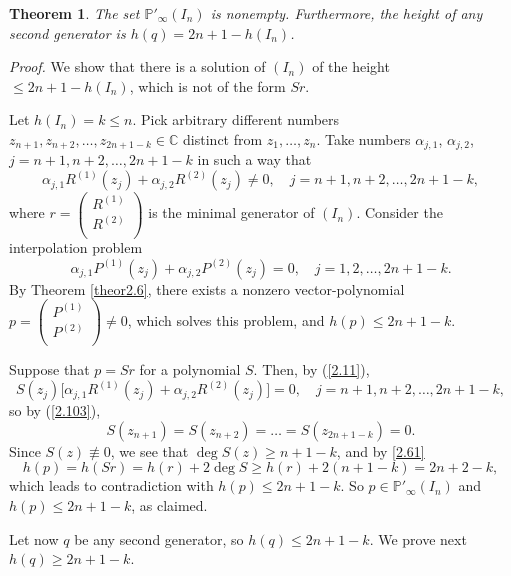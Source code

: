 \documentclass{amsart}
\newtheorem{theorem}{Theorem}[section]
\begin{document}
\begin{theorem}\label{theor2.7}
The set ${{\mathbb P}}'_\infty(I_n)$ is nonempty. Furthermore, the height of
any second generator is $h(q)=2n+1-h(I_n)$.
\end{theorem}

{\it Proof.} We show that there is a solution of $(I_n)$ of the
height $\le 2n+1-h(I_n)$, which is not of the form $Sr$.

Let $h(I_n)=k\le n$. Pick arbitrary different numbers
$z_{n+1},z_{n+2},\ldots,z_{2n+1-k}\in {{\mathbb C}}$ distinct from
$z_1,\ldots,z_n$. Take numbers ${\alpha}_{j,1}$, ${\alpha}_{j,2}$,
$j=n+1,n+2,\ldots,2n+1-k$ in such a way that
\begin{equation}\label{2.103} {\alpha}_{j,1}
R^{(1)} (z_j) + {\alpha}_{j,2} R^{(2)} (z_j) \ne 0, \quad
j=n+1,n+2,\ldots,2n+1-k,
\end{equation}
where $ r = \left(\begin{array}{c} R^{(1)} \\ R^{(2)}\\
\end{array}\right) $ is the minimal generator of $(I_n)$.
Consider the interpolation problem
\begin{equation}\label{2.11} {\alpha}_{j,1}
P^{(1)} (z_j) + {\alpha}_{j,2} P^{(2)} (z_j) = 0, \quad
j=1,2,\ldots,2n+1-k.
\end{equation}
By Theorem \ref{theor2.6}, there exists a nonzero vector-polynomial
$ p =
 \left(\begin{array}{c} P^{(1)} \\ P^{(2)}\\
\end{array}\right) \ne 0$, which solves this problem, and $h(p)
\leq 2n + 1 -k$.

Suppose that $p = Sr$ for a polynomial $S$. Then, by (\ref{2.11}),
$$ S(z_j) \bigl[ {\alpha}_{j,1} R^{(1)} (z_j) + {\alpha}_{j,2} R^{(2)} (z_j) \bigr] = 0,
\quad j=n+1,n+2,\ldots,2n+1-k,
$$
so by (\ref{2.103}),
$$ S(z_{n+1}) = S(z_{n+2}) = \ldots = S(z_{2n+1-k})=0.
$$
Since $S(z)\not\equiv 0$, we see that $\deg S(z) \ge n+1 -k$, and by
\eqref{2.61}
$$ h(p)=h(Sr)=h(r)+2\deg S\ge h(r) + 2(n+1-k) = 2n +2 -k,
$$
which leads to contradiction with $h(p) \leq 2n +1 -k$. So
$p\in{{\mathbb P}}'_\infty(I_n)$ and $h(p)\le 2n+1-k$, as claimed.

\medskip

Let now $q$ be any second generator, so $h(q)\le 2n+1-k$. We prove
next $h(q) \ge 2n+1-k$.
\end{document}
